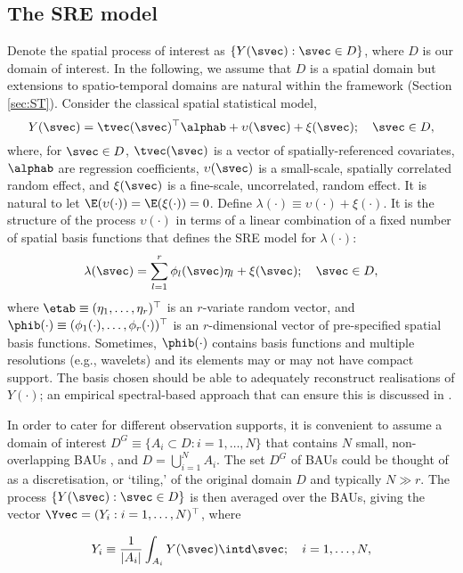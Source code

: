 \subsection{The SRE model} \label{sec:SREModel}

Denote the spatial process of interest as $\{Y(\svec) : \svec \in D\}$, where $D$ is our domain of interest. In the following, we assume that $D$ is a spatial domain but extensions to spatio-temporal domains are natural within the framework (Section \ref{sec:ST}). Consider the classical spatial statistical model,
\begin{equation*}
Y(\svec) = \tvec(\svec)^\top\alphab + \upsilon(\svec) + \xi(\svec); \quad \svec \in D,
\end{equation*}
where, for $\svec \in D$, $\tvec(\svec)$ is a vector of spatially-referenced covariates, $\alphab$ are regression coefficients, $\upsilon(\svec)$ is a small-scale, spatially correlated random effect, and $\xi(\svec)$ is a fine-scale, uncorrelated, random effect. It is natural to let $\E(\upsilon(\cdot)) = \E(\xi(\cdot)) = 0$. Define $\lambda(\cdot) \equiv \upsilon(\cdot) + \xi(\cdot)$. It is the structure of the process $\upsilon(\cdot)$ in terms of a linear combination of a fixed number of spatial basis functions that defines the SRE model for $\lambda(\cdot)$:
$$
\lambda(\svec) = \sum_{l=1}^r \phi_l(\svec)\eta_l + \xi(\svec);\quad \svec \in D,
$$
\noindent where $\etab \equiv (\eta_1,\dots,\eta_r)^\top$ is an $r$-variate random vector, and $\phib(\cdot) \equiv (\phi_1(\cdot),\dots,\phi_r(\cdot))^\top$ is an $r$-dimensional vector of pre-specified spatial basis functions. Sometimes, $\phib(\cdot)$ contains basis functions and multiple resolutions (e.g., wavelets) and its elements may or may not have compact support. The basis chosen should be able to adequately reconstruct realisations of $Y(\cdot)$; an empirical spectral-based approach that can ensure this is discussed in \cite{Zammit_2012}.

In order to cater for different observation supports, it is convenient to assume a domain of interest $D^G \equiv \{A_i \subset D: i = 1,\dots,N\}$ that contains $N$ small, non-overlapping BAUs \citep{Nguyen_2012}, and $D = \bigcup_{i=1}^N A_i$. The set $D^G$ of BAUs could be thought of as a discretisation, or `tiling,' of the original domain $D$ and typically $N \gg r$. The process $\{Y(\svec): \svec \in D\}$ is then averaged over the BAUs, giving the vector $\Yvec = (Y_i : i = 1,\dots,N)^\top$, where

\begin{equation}\label{eq:Yi0}
Y_i \equiv \frac{1}{|A_i|}\int_{A_i} Y(\svec) \intd \svec; \quad i = 1,\dots,N,
\end{equation}

